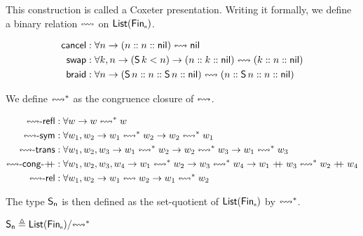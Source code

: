 
This construction is called a Coxeter presentation. Writing it formally, we define a binary relation $\cox$ on
$\List[\Fin[n]]$.

\begin{definition}[$\cox$]
  \begin{align*}
    \cancel
     & : \forall n \to (n \cons n \cons \nil) \cox \nil                                                     \\
    \swap
     & : \forall k, n \to (\suc[k] < n) \to (n \cons k \cons \nil) \cox (k \cons n \cons \nil)              \\
    \braid
     & : \forall n \to (\suc[n] \cons n \cons \suc[n] \cons \nil) \cox (n \cons \suc[n] \cons n \cons \nil) \\
  \end{align*}
\end{definition}

We define $\cox*$ as the congruence closure of $\cox$.

\begin{definition}[$\cox*$]
  \begin{align*}
    \reflr{\cox}
     & : \forall w \to w \cox* w                                                                                                           \\
    \symr{\cox}
     & : \forall w_{1}, w_{2} \to w_{1} \cox* w_{2} \to w_{2} \cox* w_{1}                                                                  \\
    \transr{\cox}
     & : \forall w_{1}, w_{2}, w_{3} \to  w_{1} \cox* w_{2} \to w_{2} \cox* w_{3} \to w_{1} \cox* w_{3}                                    \\
    \congrf{\cox}{\append}
     & : \forall w_{1}, w_{2}, w_{3}, w_{4} \to  w_{1} \cox* w_{2} \to w_{3} \cox* w_{4} \to w_{1} \append w_{3} \cox* w_{2} \append w_{4} \\
    \relr{\cox}
     & : \forall w_{1}, w_{2} \to w_{1} \cox w_{2} \to w_{1} \cox* w_{2}                                                                   \\
  \end{align*}
\end{definition}

The type $\Sn$ is then defined as the set-quotient of $\List[\Fin[n]]$ by $\cox*$.

\begin{definition}[$\Sn$]
  \(\Sn \defeq \quot{\List(\Fin[n])}{\cox*}\)
\end{definition}

